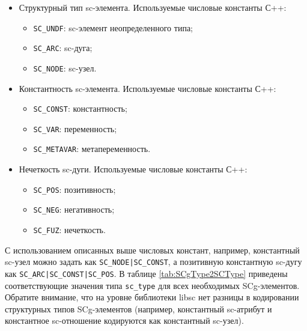 \begin{itemize}
\item Структурный тип sc-элемента. Используемые числовые константы
  С++:
  \begin{itemize}
  \item \lstinline{SC_UNDF}: sc-элемент неопределенного типа;
  \item \lstinline{SC_ARC}: sc-дуга;
  \item \lstinline{SC_NODE}: sc-узел.
  \end{itemize}

\item Константность sc-элемента. Используемые числовые константы С++:
  \begin{itemize}
  \item \lstinline{SC_CONST}: константность;
  \item \lstinline{SC_VAR}: переменность;
  \item \lstinline{SC_METAVAR}: метапеременность.
  \end{itemize}

\item Нечеткость sc-дуги. Используемые числовые константы С++:
  \begin{itemize}
  \item \lstinline{SC_POS}: позитивность;
  \item \lstinline{SC_NEG}: негативность;
  \item \lstinline{SC_FUZ}: нечеткость.
  \end{itemize}
\end{itemize}

С использованием описанных выше числовых констант, например,
константный sc-узел можно задать как \lstinline{SC_NODE|SC_CONST}, а
позитивную константную sc-дугу как
\lstinline{SC_ARC|SC_CONST|SC_POS}. В таблице \ref{tab:SCgType2SCType}
приведены соответствующие значения типа \lstinline{sc_type} для всех
необходимых SCg-элементов. Обратите внимание, что на уровне библиотеки
libsc нет разницы в кодировании структурных типов SCg-элементов
(например, константный sc-атрибут и константное sc-отношение
кодируются как константный sc-узел).

